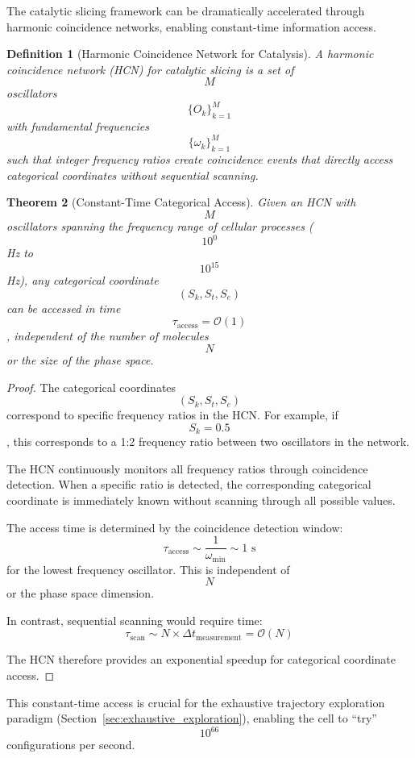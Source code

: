 \documentclass[11pt,twocolumn,a4paper]{article}
\newtheorem{theorem}{Theorem}[section]
\newtheorem{definition}[theorem]{Definition}
\theoremstyle{remark}
\begin{document}
The catalytic slicing framework can be dramatically accelerated through harmonic coincidence networks, enabling constant-time information access.

\begin{definition}[Harmonic Coincidence Network for Catalysis]
\label{def:hcn_catalysis}
A harmonic coincidence network (HCN) for catalytic slicing is a set of $$M$$ oscillators $$\{O_k\}_{k=1}^M$$ with fundamental frequencies $$\{\omega_k\}_{k=1}^M$$ such that integer frequency ratios create coincidence events that directly access categorical coordinates without sequential scanning.
\end{definition}

\begin{theorem}[Constant-Time Categorical Access]
\label{thm:constant_time_access}
Given an HCN with $$M$$ oscillators spanning the frequency range of cellular processes ($$10^0$$ Hz to $$10^{15}$$ Hz), any categorical coordinate $$(S_k, S_t, S_e)$$ can be accessed in time $$\tau_{\mathrm{access}} = \mathcal{O}(1)$$, independent of the number of molecules $$N$$ or the size of the phase space.
\end{theorem}

\begin{proof}
The categorical coordinates $$(S_k, S_t, S_e)$$ correspond to specific frequency ratios in the HCN. For example, if $$S_k = 0.5$$, this corresponds to a 1:2 frequency ratio between two oscillators in the network.

The HCN continuously monitors all frequency ratios through coincidence detection. When a specific ratio is detected, the corresponding categorical coordinate is immediately known without scanning through all possible values.

The access time is determined by the coincidence detection window:
$$
\tau_{\mathrm{access}} \sim \frac{1}{\omega_{\mathrm{min}}} \sim 1 \text{ s}
$$
for the lowest frequency oscillator. This is independent of $$N$$ or the phase space dimension.

In contrast, sequential scanning would require time:
$$
\tau_{\mathrm{scan}} \sim N \times \Delta t_{\mathrm{measurement}} = \mathcal{O}(N)
$$

The HCN therefore provides an exponential speedup for categorical coordinate access.
\end{proof}

This constant-time access is crucial for the exhaustive trajectory exploration paradigm (Section~\ref{sec:exhaustive_exploration}), enabling the cell to ``try'' $$10^{66}$$ configurations per second.
\end{document}

